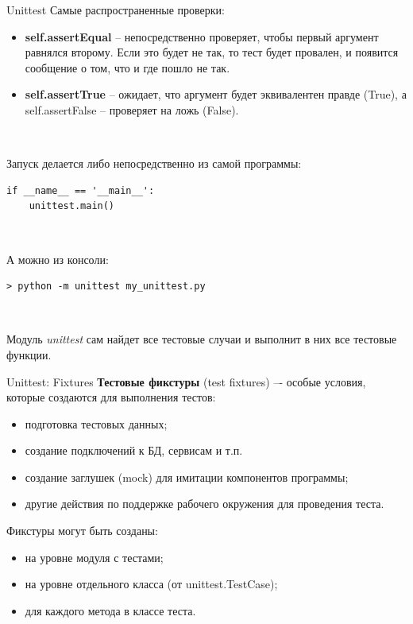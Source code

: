 \documentclass[xcolor=table]{beamer}
\begin{document}
\begin{frame}[t, fragile]{Unittest}
	Самые распространенные проверки:
	\begin{itemize}
		\item \textbf{self.assertEqual} – непосредственно проверяет, чтобы первый аргумент равнялся второму. Если это будет не так, то тест будет провален, и появится сообщение о том, что и где пошло не так.
		\item \textbf{self.assertTrue} – ожидает, что аргумент будет эквивалентен правде (True), а self.assertFalse – проверяет на ложь (False).	
	\end{itemize}
	
	~
	
	Запуск делается либо непосредственно из самой программы:
	\begin{verbatim}    
if __name__ == '__main__':
    unittest.main()
	\end{verbatim}
	
	~
	
	А можно из консоли:
	\begin{verbatim}    
> python -m unittest my_unittest.py
	\end{verbatim}
	
	~
	
	Модуль \textit{unittest} сам найдет все тестовые случаи и выполнит в них все тестовые функции.	
\end{frame}

\begin{frame}[t, fragile]{Unittest: Fixtures}
	\linespread{1.0}
	\textbf{Тестовые фикстуры} (test fixtures) –- особые условия, которые создаются для выполнения тестов:
	\begin{itemize}
		\item подготовка тестовых данных;
		\item создание подключений к БД, сервисам и т.п.
		\item создание заглушек (mock) для имитации компонентов программы;
		\item другие действия по поддержке рабочего окружения для проведения теста.	
	\end{itemize}
	Фикстуры могут быть созданы: 
	\begin{itemize}
		\item на уровне модуля с тестами; 
		\item на уровне отдельного класса (от unittest.TestCase); 
		\item для каждого метода в классе теста.
	\end{itemize}	
\end{frame}
\end{document}
